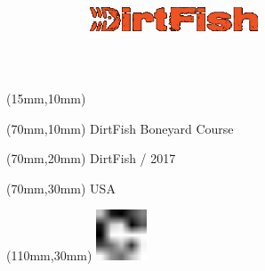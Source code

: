 \null\newpage
\begin{textblock*}{50mm}(15mm,10mm)%
\includegraphics[width=50mm]{LG/DIR.png}
\end{textblock*}
\begin{textblock*}{130mm}(70mm,10mm)%
{\fontsize{20}{20}\selectfont DirtFish Boneyard Course}\\
\end{textblock*}
\begin{textblock*}{120mm}(70mm,20mm)%
{\fontsize{16}{16}\selectfont DirtFish / 2017}\\
\end{textblock*}
\begin{textblock*}{120mm}(70mm,30mm)%
{\fontsize{12}{12}\selectfont USA}
\end{textblock*}
\begin{textblock*}{30mm}(110mm,30mm)%
\centering
\includegraphics[height=15mm]{icons/fa-rotate-right.pdf}
\end{textblock*}
